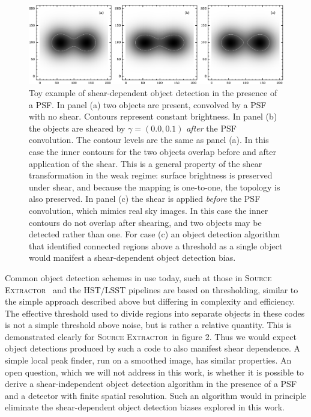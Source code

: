 \documentclass[fleqn,useAMS,usenatbib]{mnras}
\newcommand{\sx}{\textsc{Source Extractor}}
\begin{document}
\begin{figure}
  \includegraphics[width=\textwidth]{figures/toy.png}

  \caption{ Toy example of shear-dependent object detection in the presence of
    a PSF.  In panel (a) two objects are present, convolved by a PSF with no
    shear.  Contours represent constant brightness.  In panel (b) the objects
    are sheared by $\gamma = (0.0, 0.1)$ {\em after} the PSF convolution.  The
    contour levels are the same as panel (a).  In this case the inner contours
    for the two objects overlap before and after application of the shear. This
    is a general property of the shear transformation in the weak regime:
    surface brightness is preserved under shear, and because the mapping is
    one-to-one, the topology is also preserved. In panel (c) the shear is
    applied {\em before} the PSF convolution, which mimics real sky images. In
    this case the inner contours do not overlap after shearing, and two objects
    may be detected rather than one.  For case (c) an object detection
    algorithm that identified connected regions above a threshold as a single
    object would manifest a shear-dependent object detection bias.
    \label{fig:toy} }

\end{figure}

Common object detection schemes in use today, such at those in \sx\
\citep{Bertin96} and the HST/LSST pipelines \citep{BoschHSC2018,BoschLSST2018}
are based on thresholding, similar to the simple approach described above but
differing in complexity and efficiency. The effective threshold used to divide
regions into separate objects in these codes is not a simple threshold above
noise, but is rather a relative quantity.  This is demonstrated clearly for
\sx\ in \cite{Bertin96} figure 2.  Thus we would expect object detections
produced by such a code to also manifest shear dependence. A simple local peak
finder, run on a smoothed image, has similar properties.  An open question,
which we will not address in this work, is whether it is possible to derive a
shear-independent object detection algorithm  in the presence of a PSF and a
detector with finite spatial resolution.  Such an algorithm would in principle
eliminate the shear-dependent object detection biases explored in this work.
\end{document}
